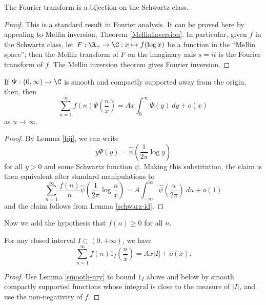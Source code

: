 \begin{lemma}\label{bij}\leanok  The Fourier transform is a bijection on the Schwartz class.
\end{lemma}


\begin{proof}
 This is a standard result in Fourier analysis.
It can be proved here by appealing to Mellin inversion, Theorem \ref{MellinInversion}.
In particular, given $f$ in the Schwartz class, let $F : \R_+ \to \C : x \mapsto f(\log x)$ be a function in the ``Mellin space''; then the Mellin transform of $F$ on the imaginary axis $s=it$ is the Fourier transform of $f$.  The Mellin inversion theorem gives Fourier inversion.
\end{proof}


\begin{corollary}\label{WienerIkeharaSmooth}\leanok
  If $\Psi: (0,\infty) \to \C$ is smooth and compactly supported away from the origin, then, then
$$ \sum_{n=1}^\infty f(n) \Psi( \frac{n}{x} ) = A x \int_0^\infty \Psi(y)\ dy + o(x)$$
as $u \to \infty$.
\end{corollary}


\begin{proof}
 By Lemma \ref{bij}, we can write
$$ y \Psi(y) = \hat \psi( \frac{1}{2\pi} \log y )$$
for all $y>0$ and some Schwartz function $\psi$.  Making this substitution, the claim is then equivalent after standard manipulations to
$$ \sum_{n=1}^\infty \frac{f(n)}{n} \hat \psi( \frac{1}{2\pi} \log \frac{n}{x} ) = A \int_{-\infty}^\infty \hat \psi(\frac{u}{2\pi})\ du + o(1)$$
and the claim follows from Lemma \ref{schwarz-id}.
\end{proof}


Now we add the hypothesis that $f(n) \geq 0$ for all $n$.

\begin{proposition}
\label{WienerIkeharaInterval}\leanok
  For any closed interval $I \subset (0,+\infty)$, we have
  $$ \sum_{n=1}^\infty f(n) 1_I( \frac{n}{x} ) = A x |I|  + o(x).$$
\end{proposition}


\begin{proof}
  Use Lemma \ref{smooth-ury} to bound $1_I$ above and below by smooth compactly supported functions whose integral is close to the measure of $|I|$, and use the non-negativity of $f$.
\end{proof}


